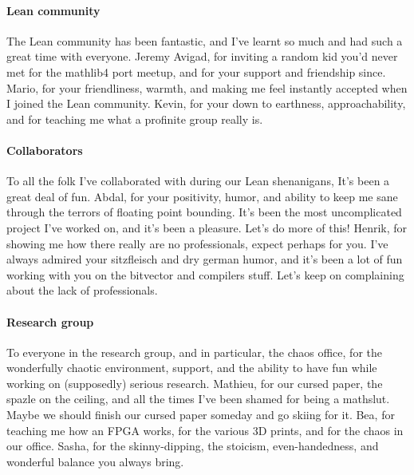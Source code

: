 \paragraph{Lean community}
The Lean community has been fantastic, and I've learnt so much and had such a great time with everyone. 
Jeremy Avigad, for inviting a random kid you'd never met for the mathlib4 port meetup,
and for your support and friendship since.
Mario, for your friendliness, warmth, and making me feel instantly accepted when I joined the Lean community.
Kevin, for your down to earthness, approachability, and for teaching me what a profinite group really is.


\paragraph{Collaborators}
To all the folk I've collaborated with during our Lean shenanigans, It's been a great deal of fun.
Abdal, for your positivity, humor, and ability to keep me sane through the terrors of floating point bounding.
It's been the most uncomplicated project I've worked on,
and it's been a pleasure. Let's do more of this!
Henrik, for showing me how there really are no professionals,
expect perhaps for you. I've always admired your sitzfleisch and dry german humor,
and it's been a lot of fun working with you on the bitvector and compilers stuff.
Let's keep on complaining about the lack of professionals.

\paragraph{Research group}
To everyone in the research group, and in particular, the chaos office,
for the wonderfully chaotic environment, support, and the ability to have fun while working on (supposedly) serious research.
Mathieu, for our cursed paper, the spazle on the ceiling, and all the times I've been shamed for being a mathslut.
Maybe we should finish our cursed paper someday and go skiing for it.
Bea, for teaching me how an FPGA works, for the various 3D prints, and for the chaos in our office.
Sasha, for the skinny-dipping, the stoicism, even-handedness, and wonderful balance you always bring.


